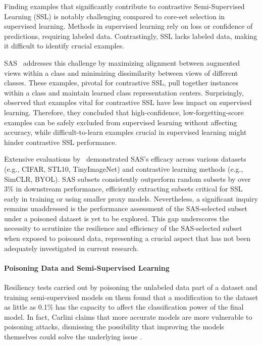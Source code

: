 Finding examples that significantly contribute to contrastive Semi-Supervised Learning (SSL) is notably challenging compared to core-set selection in supervised learning. Methods in supervised learning rely on loss or confidence of predictions, requiring labeled data. Contrastingly, SSL lacks labeled data, making it difficult to identify crucial examples.

SAS~\cite{pmlr-v202-joshi23b} addresses this challenge by maximizing alignment between augmented views within a class and minimizing dissimilarity between views of different classes. These examples, pivotal for contrastive SSL, pull together instances within a class and maintain learned class representation centers. Surprisingly,~\cite{pmlr-v202-joshi23b} observed that examples vital for contrastive SSL have less impact on supervised learning. Therefore, they concluded that high-confidence, low-forgetting-score examples can be safely excluded from supervised learning without affecting accuracy, while difficult-to-learn examples crucial in supervised learning might hinder contrastive SSL performance.

Extensive evaluations by~\cite{pmlr-v202-joshi23b} demonstrated SAS's efficacy across various datasets (e.g., CIFAR, STL10, TinyImageNet) and contrastive learning methods (e.g., SimCLR, BYOL). SAS subsets consistently outperform random subsets by over 3\% in downstream performance, efficiently extracting subsets critical for SSL early in training or using smaller proxy models. Nevertheless, a significant inquiry remains unaddressed is the performance assessment of the SAS-selected subset under a poisoned dataset is yet to be explored. This gap underscores the necessity to scrutinize the resilience and efficiency of the SAS-selected subset when exposed to poisoned data, representing a crucial aspect that has not been adequately investigated in current research.

\paragraph{Poisoning Data and Semi-Supervised Learning}

Resiliency tests carried out by poisoning the unlabeled data part of a dataset and training semi-supervised models on them found that a modification to the dataset as little as 0.1\% has the capacity to affect the classification power of the final model. In fact, Carlini claims that more accurate models are more vulnerable to poisoning attacks, dismissing the possibility that improving the models themselves could solve the underlying issue \cite{carlini2021}.
